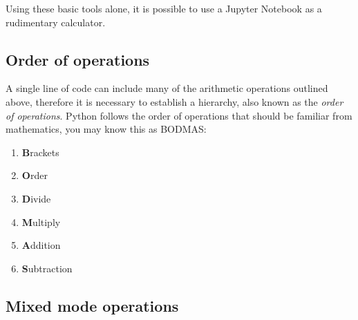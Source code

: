 \documentclass[a4paper]{article}
\begin{document}
Using these basic tools alone, it is possible to use a Jupyter Notebook as a rudimentary calculator. 

\subsection{Order of operations}

A single line of code can include many of the arithmetic operations outlined above, therefore it is necessary to establish a hierarchy, also known as the \emph{order of operations}. 
Python follows the order of operations that should be familiar from mathematics, you may know this as BODMAS: 
\begin{enumerate}
	\item{\textbf{B}rackets}
	\item{\textbf{O}rder}
	\item{\textbf{D}ivide}
	\item{\textbf{M}ultiply}
	\item{\textbf{A}ddition}
	\item{\textbf{S}ubtraction}
\end{enumerate}
\vspace{\baselineskip}
\begin{center}
	\noindent{}
\end{center}

\subsection{Mixed mode operations}
\end{document}
